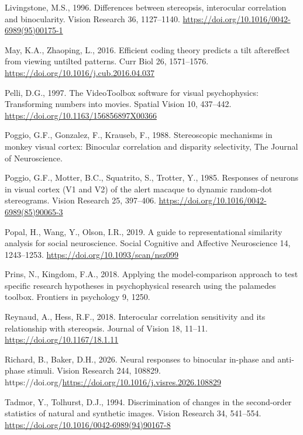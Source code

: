 \documentclass[
  12pt,
]{article}
\newlength{\cslhangindent}
\newenvironment{CSLReferences}[2] %
 {\begin{list}{}{%
  \setlength{\itemindent}{0pt}
  \setlength{\leftmargin}{0pt}
  \setlength{\parsep}{0pt}
  \ifodd #1
   \setlength{\leftmargin}{\cslhangindent}
   \setlength{\itemindent}{-1\cslhangindent}
  \fi
  \setlength{\itemsep}{#2\baselineskip}}}
 {\end{list}}
\begin{document}
\begin{CSLReferences}{1}{0}
Livingstone, M.S., 1996. Differences between stereopsis, interocular
correlation and binocularity. Vision Research 36, 1127--1140.
\url{https://doi.org/10.1016/0042-6989(95)00175-1}

May, K.A., Zhaoping, L., 2016. Efficient coding theory predicts a tilt
aftereffect from viewing untilted patterns. Curr Biol 26, 1571--1576.
\url{https://doi.org/10.1016/j.cub.2016.04.037}

Pelli, D.G., 1997. The VideoToolbox software for visual psychophysics:
Transforming numbers into movies. Spatial Vision 10, 437--442.
\url{https://doi.org/10.1163/156856897X00366}

Poggio, G.F., Gonzalez, F., Krauseb, F., 1988. Stereoscopic mechanisms
in monkey visual cortex: Binocular correlation and disparity
selectivity, The Journal of Neuroscience.

Poggio, G.F., Motter, B.C., Squatrito, S., Trotter, Y., 1985. Responses
of neurons in visual cortex (V1 and V2) of the alert macaque to dynamic
random-dot stereograms. Vision Research 25, 397--406.
\url{https://doi.org/10.1016/0042-6989(85)90065-3}

Popal, H., Wang, Y., Olson, I.R., 2019. A guide to representational
similarity analysis for social neuroscience. Social Cognitive and
Affective Neuroscience 14, 1243--1253.
\url{https://doi.org/10.1093/scan/nsz099}

Prins, N., Kingdom, F.A., 2018. Applying the model-comparison approach
to test specific research hypotheses in psychophysical research using
the palamedes toolbox. Frontiers in psychology 9, 1250.

Reynaud, A., Hess, R.F., 2018. Interocular correlation sensitivity and
its relationship with stereopsis. Journal of Vision 18, 11--11.
\url{https://doi.org/10.1167/18.1.11}

Richard, B., Baker, D.H., 2026. Neural responses to binocular in-phase
and anti-phase stimuli. Vision Research 244, 108829.
https://doi.org/\url{https://doi.org/10.1016/j.visres.2026.108829}

Tadmor, Y., Tolhurst, D.J., 1994. Discrimination of changes in the
second-order statistics of natural and synthetic images. Vision Research
34, 541--554. \url{https://doi.org/10.1016/0042-6989(94)90167-8}


\end{CSLReferences}
\end{document}

